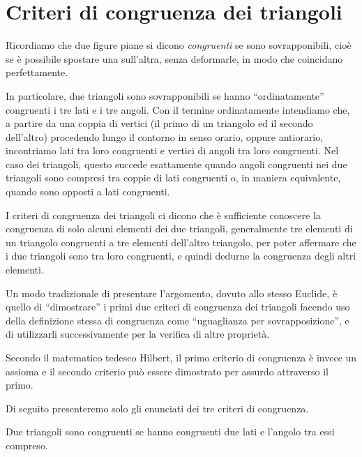 \section{Criteri di congruenza dei triangoli}
\label{sect:primo_secondo_criterio_di_congruenza_triangoli}

Ricordiamo che due figure piane si dicono \emph{congruenti} se sono 
sovrapponibili, cioè se è possibile spostare una sull'altra, senza 
deformarle, in modo che coincidano perfettamente. 

In particolare, due triangoli sono sovrapponibili se hanno 
``ordinatamente'' congruenti i tre lati e i tre angoli. Con il 
termine ordinatamente intendiamo che, a partire da una coppia di 
vertici (il primo di un triangolo ed il secondo dell'altro) procedendo 
lungo il contorno in senso orario, oppure antiorario, incontriamo lati 
tra loro congruenti e vertici di angoli tra loro congruenti. Nel caso 
dei triangoli, questo succede esattamente quando angoli congruenti nei 
due triangoli sono compresi tra coppie di lati congruenti o, in 
maniera equivalente, quando sono opposti a lati congruenti.

I criteri di congruenza dei triangoli ci dicono che è sufficiente 
conoscere la congruenza di solo alcuni elementi dei due triangoli, 
generalmente tre elementi di un triangolo congruenti a tre elementi 
dell'altro triangolo, per poter affermare che i due triangoli sono 
tra loro congruenti, e quindi dedurne la congruenza degli altri 
elementi.

Un modo tradizionale di presentare l'argomento, dovuto allo stesso 
Euclide, è quello di ``dimostrare'' i primi due criteri di congruenza 
dei triangoli facendo uso della definizione stessa di congruenza come 
``uguaglianza per sovrapposizione'', e di utilizzarli successivamente 
per la verifica di altre proprietà.

Secondo il matematico tedesco Hilbert, il primo criterio di 
congruenza è invece un assioma e il secondo criterio può essere 
dimostrato per assurdo attraverso il primo. 

Di seguito presenteremo solo gli enunciati dei tre criteri di congruenza.

\begin{teorema}
Due triangoli sono congruenti se hanno congruenti due lati e l'angolo 
tra essi compreso.
\end{teorema}


